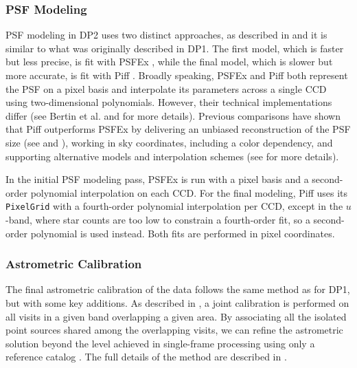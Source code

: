 \subsubsection{PSF Modeling} \label{sec:drp-calibration-psfmodeling}

\gls{PSF} modeling in \gls{DP2} uses two distinct approaches, as described in
\citet[][]{PSTN-019} and it is similar to what was originally
described in \gls{DP1}.
The first model, which is faster but less precise, is fit with
PSFEx \citep[][]{2011ASPC..442..435B}, while the final model, which is slower but more
accurate, is fit with Piff \citep[][]{2021MNRAS.501.1282J}.
Broadly speaking, PSFEx and Piff both represent the \gls{PSF} on a pixel basis and interpolate its
parameters across a single \gls{CCD} using two-dimensional polynomials.
However, their technical implementations differ (see Bertin et al.
and \citealt[][]{2021MNRAS.501.1282J} for more details).
Previous comparisons have shown that Piff outperforms PSFEx by delivering an unbiased reconstruction of the PSF size (see \citealt[][]{2018MNRAS.481.1149Z} and \citealt[][]{2021MNRAS.501.1282J}), working in sky coordinates, including a color dependency, and supporting alternative models and interpolation schemes (see \citealt[][]{2025OJAp....8E..26S} for more details).


In the initial \gls{PSF} modeling pass, PSFEx is run with a pixel basis and
a second-order polynomial interpolation on each \gls{CCD}.
For the final modeling, Piff uses its \texttt{PixelGrid} with a fourth-order polynomial interpolation per
\gls{CCD}, except in the $u$-band, where star counts are too low to constrain a
fourth-order fit, so a second-order polynomial is used instead.
Both fits are performed in pixel coordinates.


\subsubsection{Astrometric Calibration} \label{sec:drp-calibration-astrometry}
The final astrometric \gls{calibration} of the data follows the same method as for DP1, but with some key additions.
As described in \citet[][]{10.71929/rubin/2570308}, a joint calibration is performed on all visits in a given band overlapping a given area.
By associating all the isolated point sources shared among the overlapping visits, we can refine the astrometric solution beyond the level achieved in single-frame processing using only a reference catalog \citep[][]{DMTN-266}.
The full details of the method are described in \citet[][]{DMTN-266}.

